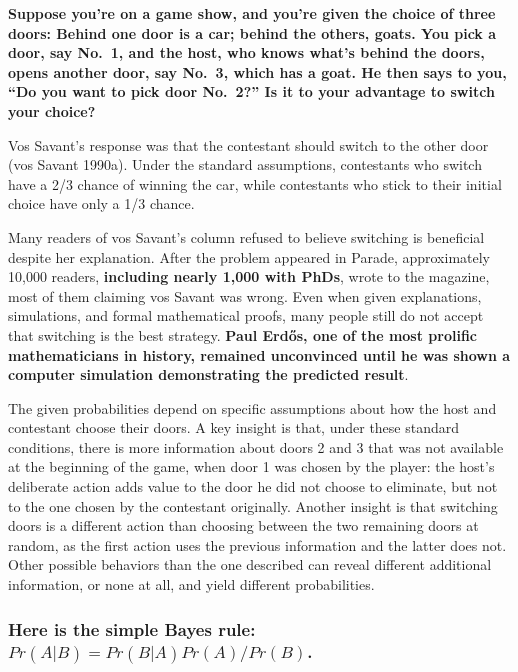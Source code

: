\documentclass[
]{book}
\theoremstyle{definition}
\theoremstyle{definition}
\theoremstyle{definition}
\theoremstyle{definition}
\theoremstyle{remark}
\begin{document}
\textbf{Suppose you're on a game show, and you're given the choice of three doors: Behind one door is a car; behind the others, goats. You pick a door, say No.~1, and the host, who knows what's behind the doors, opens another door, say No.~3, which has a goat. He then says to you, ``Do you want to pick door No.~2?'' Is it to your advantage to switch your choice?}

Vos Savant's response was that the contestant should switch to the other door (vos Savant 1990a). Under the standard assumptions, contestants who switch have a 2/3 chance of winning the car, while contestants who stick to their initial choice have only a 1/3 chance.

Many readers of vos Savant's column refused to believe switching is beneficial despite her explanation. After the problem appeared in Parade, approximately 10,000 readers, \textbf{including nearly 1,000 with PhDs}, wrote to the magazine, most of them claiming vos Savant was wrong. Even when given explanations, simulations, and formal mathematical proofs, many people still do not accept that switching is the best strategy. \textbf{Paul Erdős, one of the most prolific mathematicians in history, remained unconvinced until he was shown a computer simulation demonstrating the predicted result}.

The given probabilities depend on specific assumptions about how the host and contestant choose their doors. A key insight is that, under these standard conditions, there is more information about doors 2 and 3 that was not available at the beginning of the game, when door 1 was chosen by the player: the host's deliberate action adds value to the door he did not choose to eliminate, but not to the one chosen by the contestant originally. Another insight is that switching doors is a different action than choosing between the two remaining doors at random, as the first action uses the previous information and the latter does not. Other possible behaviors than the one described can reveal different additional information, or none at all, and yield different probabilities.

\hypertarget{here-is-the-simple-bayes-rule-prab-prbapraprb.}{%
\subsubsection*{\texorpdfstring{Here is the simple Bayes rule: \(Pr(A|B) = Pr(B|A)Pr(A)/Pr(B)\).}{Here is the simple Bayes rule: Pr(A\textbar B) = Pr(B\textbar A)Pr(A)/Pr(B).}}\label{here-is-the-simple-bayes-rule-prab-prbapraprb.}}
\end{document}
